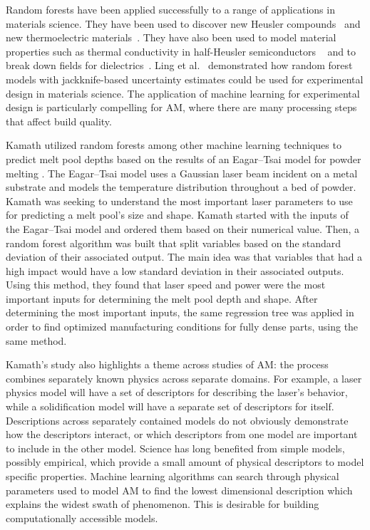 Random forests have been applied successfully to a range of applications in materials science. They have been used to discover new Heusler compounds~\cite{Anton} and new thermoelectric materials~\cite{Gaultois}. They have also been used to model material properties such as thermal conductivity in half-Heusler semiconductors ~\cite{Carrete} and to break down fields for dielectrics~\cite{Kim2016}. Ling et al.~\cite{Ling2017IMMI} demonstrated how random forest models with jackknife-based uncertainty estimates could be used for experimental design in materials science. The application of machine learning for experimental design is particularly compelling for AM, where there are many processing steps that affect build quality. 

Kamath utilized random forests among other machine learning techniques to predict melt pool depths based on the results of an Eagar--Tsai model for powder melting \cite{Kamath2016}. The Eagar--Tsai model uses a Gaussian laser beam incident on a metal substrate and models the temperature distribution throughout a bed of powder. Kamath was seeking to understand the most important laser parameters to use for predicting a melt pool's size and shape. Kamath started with the inputs of the Eagar--Tsai model and ordered them based on their numerical value. Then, a random forest algorithm was built that split variables based on the standard deviation of their associated output. The main idea was that variables that had a high impact would have a low standard deviation in their associated outputs. Using this method, they found that laser speed and power were the most important inputs for determining the melt pool depth and shape. After determining the most important inputs, the same regression tree was applied in order to find optimized manufacturing conditions for fully dense parts, using the same method.

Kamath's study also highlights a theme across studies of AM: the process combines separately known physics across separate domains. For example, a laser physics model will have a set of descriptors for describing the laser's behavior, while a solidification model will have a separate set of descriptors for itself. Descriptions across separately contained models do not obviously demonstrate how the descriptors interact, or which descriptors from one model are important to include in the other model. Science has long benefited from simple models, possibly empirical, which provide a small amount of physical descriptors to model specific properties. Machine learning algorithms can search through physical parameters used to model AM to find the lowest dimensional description which explains the widest swath of phenomenon. This is desirable for building computationally accessible models.

